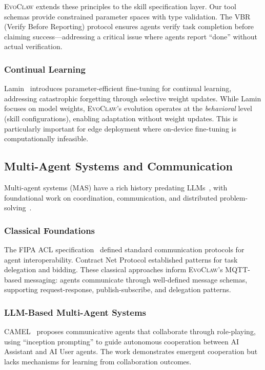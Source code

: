 \documentclass{article}
\newcommand{\evoclaw}{\textsc{EvoClaw}}
\begin{document}
\evoclaw{} extends these principles to the skill specification layer. Our tool schemas provide constrained parameter spaces with type validation. The VBR (Verify Before Reporting) protocol ensures agents verify task completion before claiming success—addressing a critical issue where agents report ``done'' without actual verification.

\subsubsection{Continual Learning}

Lamin~\cite{lamar2023lamin} introduces parameter-efficient fine-tuning for continual learning, addressing catastrophic forgetting through selective weight updates. While Lamin focuses on model weights, \evoclaw{}'s evolution operates at the \textit{behavioral} level (skill configurations), enabling adaptation without weight updates. This is particularly important for edge deployment where on-device fine-tuning is computationally infeasible.

\subsection{Multi-Agent Systems and Communication}

Multi-agent systems (MAS) have a rich history predating LLMs~\cite{wooldridge2009introduction}, with foundational work on coordination, communication, and distributed problem-solving~\cite{durfee1999distributed, rosenschein1994rules}.

\subsubsection{Classical Foundations}

The FIPA ACL specification~\cite{fipa1997acl} defined standard communication protocols for agent interoperability. Contract Net Protocol established patterns for task delegation and bidding. These classical approaches inform \evoclaw{}'s MQTT-based messaging: agents communicate through well-defined message schemas, supporting request-response, publish-subscribe, and delegation patterns.

\subsubsection{LLM-Based Multi-Agent Systems}

CAMEL~\cite{li2023camel} proposes communicative agents that collaborate through role-playing, using ``inception prompting'' to guide autonomous cooperation between AI Assistant and AI User agents. The work demonstrates emergent cooperation but lacks mechanisms for learning from collaboration outcomes.
\end{document}
